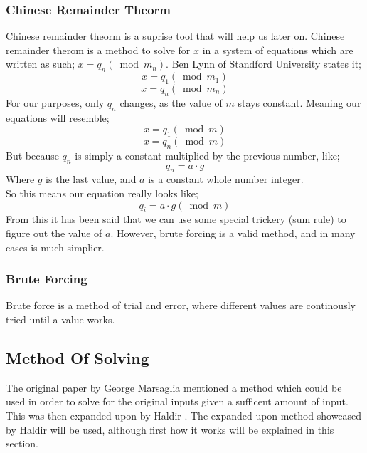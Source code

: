 \documentclass[12pft, english]{article}
\begin{document}
\begin{multicols}{2}
  \subsubsection{Chinese Remainder Theorm}
  Chinese remainder theorm is a suprise tool that will help us later on. Chinese remainder therom is a method to solve for \(x\) in a system of equations which are written as such; \(x = q_{n} (\bmod m_{n})\). Ben Lynn of Standford University states it;
   \[x = q_{1} (\bmod m_{1})\]
  \[x = q_{n} (\bmod m_{n})\]
  \citep{standChinese}
  For our purposes, only \(q_{n}\) changes, as the value of \(m\) stays constant. Meaning our equations will resemble;
  \[x = q_{1} (\bmod m)\]
  \[x = q_{n} (\bmod m)\]
  But because \(q_{n}\) is simply a constant multiplied by the previous number, like;
  \[q_{n} = a \cdot g \]
  Where \(g\) is the last value, and \(a\) is a constant whole number integer. \\
  So this means our equation really looks like;
  \[ q_{i} = a \cdot g (\bmod m)\]
  From this it has been said that we can use some special trickery (sum rule) to figure out the value of \(a\). However, brute forcing is a valid method, and in many cases is much simplier.

  \subsubsection{Brute Forcing}
  Brute force is a method of trial and error, where different values are continously tried until a value works.

  \subsection{Method Of Solving }
  The original paper by George Marsaglia \citep{fallOntoPlanes} mentioned a method which could be used in order to solve for the original inputs given a sufficent amount of input. This was then expanded upon by Haldir \citep{reteamHal}. The expanded upon method showcased by Haldir will be used, although first how it works will be explained in this section.

\end{multicols}
\end{document}
